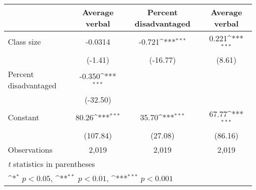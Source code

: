 {
\def\sym#1{\ifmmode^{#1}\else\(^{#1}\)\fi}
\begin{tabular}{l*{3}{c}}
\hline\hline
          &\multicolumn{1}{c}{Average verbal}&\multicolumn{1}{c}{Percent disadvantaged}&\multicolumn{1}{c}{Average verbal}\\
\hline
Class size&  -0.0314         &   -0.721\sym{***}&    0.221\sym{***}\\
          &  (-1.41)         & (-16.77)         &   (8.61)         \\
Percent disadvantaged&   -0.350\sym{***}&                  &                  \\
          & (-32.50)         &                  &                  \\
Constant  &    80.26\sym{***}&    35.70\sym{***}&    67.77\sym{***}\\
          & (107.84)         &  (27.08)         &  (86.16)         \\
\hline
Observations&    2,019         &    2,019         &    2,019         \\
\hline\hline
\multicolumn{4}{l}{\footnotesize \textit{t} statistics in parentheses}\\
\multicolumn{4}{l}{\footnotesize \sym{*} \(p<0.05\), \sym{**} \(p<0.01\), \sym{***} \(p<0.001\)}\\
\end{tabular}
}
